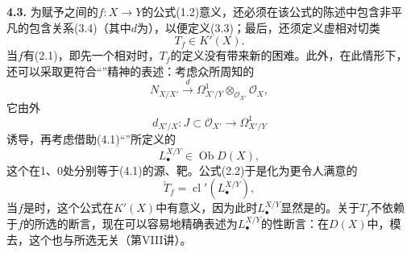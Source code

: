 \textbf{4.3.} 为赋予之间的$f:X\longrightarrow Y$的公式(1.2)意义，还必须在该公式的陈述中包含非平凡的包含关系(3.4)（其中$d$为），以便定义(3.3)；最后，还须定义虚相对切类
\[T_f\in K'(X).\]
当$f$有(2.1)，即先一个相对时，$T_f$的定义没有带来新的困难。此外，在此情形下，还可以采取更符合“”精神的表述：考虑众所周知的
\[N_{X/X'}\xrightarrow{d}\Omega^1_{X'/Y}\otimes_{\mathcal O_{X'}}\mathcal O_X,\tag{4.1}\]
它由外
\[d_{X'/X}:J\subset\mathcal O_{X'}\longrightarrow\Omega^1_{X'/Y}\]
诱导，再考虑借助(4.1)“”所定义的
\[L_{\bullet}^{X/Y}\in\operatorname{Ob}D(X),\tag{4.2}\]
这个在1、0处分别等于(4.1)的源、靶。公式(2.2)于是化为更令人满意的
\[\check T_f=\operatorname{cl}'(L_{\bullet}^{X/Y}),\tag{4.3}\]
当$f$是时，这个公式在$K'(X)$中有意义，因为此时$L_{\bullet}^{X/Y}$显然是的。关于$T_f$不依赖于$f$的所选的断言，现在可以容易地精确表述为$L_{\bullet}^{X/Y}$的性断言：在$D(X)$中，模去，这个也与所选无关（第VIII讲）。

